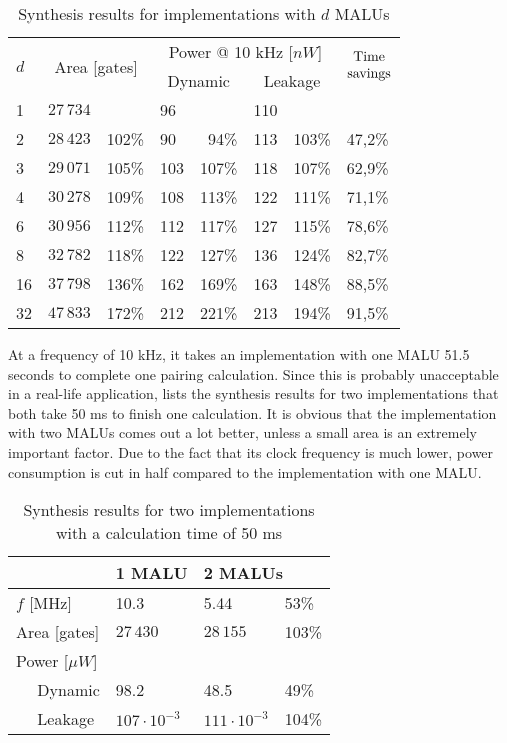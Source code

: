 \begin{table}[h]
	\caption{Synthesis results for implementations with $d$ MALUs}
	\label{table-mult-malu}
	\centering
	\begin{tabular}{llrlrlrl}
		\toprule
		\multirow{2}{*}{$d$} & \multicolumn{2}{c}{\multirow{2}{*}{Area [gates]}}	& \multicolumn{4}{c}{Power @ 10 kHz [$nW$]}	& \multirow{2}{*}{$\begin{array}{@{}c@{}}\text{Time}\\\text{savings}\end{array}$}\\
		\cmidrule{4-7}
		&	& & \multicolumn{2}{c}{Dynamic}	& \multicolumn{2}{c}{Leakage}	&\\
		\midrule
		1			& $27\,734$	& 			& 96	& 			& 110	& 			& \\
		2			& $28\,423$	& 102\%	& 90	& 94\%	& 113	& 103\%	& 47,2\%\\
		3			& $29\,071$	& 105\%	& 103	& 107\%	& 118	& 107\%	& 62,9\%\\
		4			& $30\,278$	& 109\%	& 108	& 113\%	& 122	& 111\%	& 71,1\%\\
		6			& $30\,956$	& 112\%	& 112	& 117\%	& 127	& 115\%	& 78,6\%\\
		8			& $32\,782$	& 118\%	& 122	& 127\%	& 136	& 124\%	& 82,7\%\\
		16			& $37\,798$	& 136\%	& 162	& 169\%	& 163	& 148\%	& 88,5\%\\
		32			& $47\,833$	& 172\%	& 212	& 221\%	& 213	& 194\%	& 91,5\%\\
		\hline		
	\end{tabular}
\end{table}

At a frequency of 10 kHz, it takes an implementation with one MALU 51.5 seconds to complete one pairing calculation. Since this is probably unacceptable in a real-life application,  lists the synthesis results for two implementations that both take 50 ms to finish one calculation. It is obvious that the implementation with two MALUs comes out a lot better, unless a small area is an extremely important factor. Due to the fact that its clock frequency is much lower, power consumption is cut in half compared to the implementation with one MALU.

\begin{table}[h]
	\caption{Synthesis results for two implementations with a calculation time of 50 ms}
	\label{table-speed-malu}

	\centering
	\begin{tabular}{lll@{$\;\;$}l}
		\toprule
		& 1 MALU	& \multicolumn{2}{l}{2 MALUs}\\
		\midrule
		$f$ [MHz]				& 10.3						& 5.44						& 53\% \\ 
		Area [gates]			& $27\,430$					& $28\,155$					& 103\% \\
		Power [$\mu W$]		& 								& 								& \\
		$\quad$ Dynamic		& 98.2						& 48.5						& 49\% \\
		$\quad$ Leakage		& $107 \cdot 10^{-3}$	& $111 \cdot 10^{-3}$	& 104\% \\
		\bottomrule	
	\end{tabular}
\end{table}

